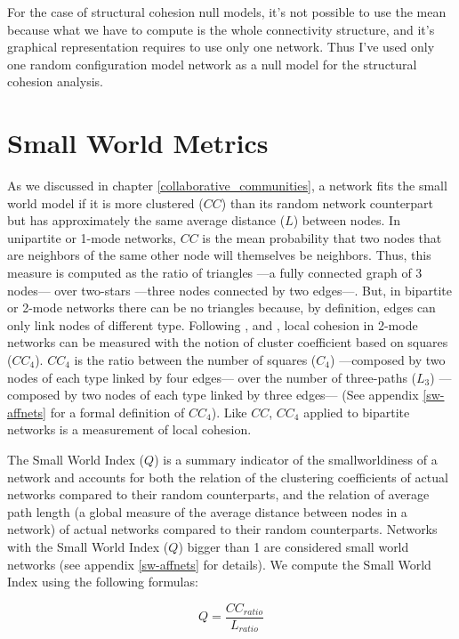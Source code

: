 For the case of structural cohesion null models, it's not possible to use the mean because what we have to compute is the whole connectivity structure, and it's graphical representation requires to use only one network. Thus I've used only one random configuration model network as a null model for the structural cohesion analysis.  

\section{Small World Metrics}

As we discussed in chapter \ref{collaborative_communities}, a network fits the small world model if it is more clustered ($CC$) than its random network counterpart but has approximately the same average distance ($L$) between nodes. In unipartite or 1-mode networks, $CC$ is the mean probability that two nodes that are neighbors of the same other node will themselves be neighbors. Thus, this measure is computed as the ratio of triangles ---a fully connected graph of 3 nodes--- over two-stars ---three nodes connected by two edges---. But, in bipartite or 2-mode networks there can be no triangles because, by definition, edges can only link nodes of different type. Following \citet{robins:2004}, \citet{lind:2005} and \citet{latapy:2008}, local cohesion in 2-mode networks can be measured with the notion of cluster coefficient based on squares ($CC_4$). $CC_4$ is the ratio between the number of squares ($C_4$) ---composed by two nodes of each type linked by four edges--- over the number of three-paths ($L_3$) ---composed by two nodes of each type linked by three edges--- (See appendix \ref{sw-affnets} for a formal definition of $CC_4$). Like $CC$, $CC_4$ applied to bipartite networks is a measurement of local cohesion.

The Small World Index ($Q$) is a summary indicator of the smallworldiness of a network and accounts for both the relation of the clustering coefficients of actual networks compared to their random counterparts, and the relation of average path length (a global measure of the average distance between nodes in a network) of actual networks compared to their random counterparts. Networks with the Small World Index ($Q$) bigger than 1 are considered small world networks (see appendix \ref{sw-affnets} for details). We compute the Small World Index using the following formulas:

\begin{equation}
Q = \frac{CC_{ratio}}{L_{ratio}}
\end{equation}

